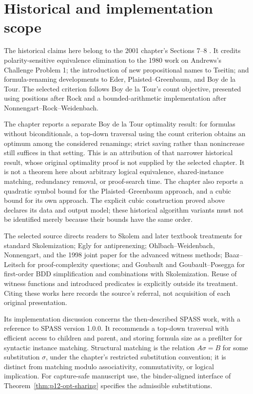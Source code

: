 \section{Historical and implementation scope}
\label{sec:p12-opt-history}
The historical claims here belong to the 2001 chapter's
Sections 7--8 \cite[pp.~363--365]{NonnengartWeidenbach2001SmallClauses}.
It credits polarity-sensitive equivalence elimination to the 1980
work on Andrews's Challenge Problem 1; the introduction of new
propositional names to Tseitin; and formula-renaming developments
to Eder, Plaisted--Greenbaum, and Boy de la Tour.
The selected criterion follows Boy de la Tour's count objective,
presented using positions after Rock and a bounded-arithmetic
implementation after Nonnengart--Rock--Weidenbach.

The chapter reports a separate Boy de la Tour optimality result:
for formulas without biconditionals, a top-down traversal using the
count criterion obtains an optimum among the considered renamings;
strict saving rather than nonincrease still suffices in that setting.
This is an attribution of that narrower historical result, whose
original optimality proof is not supplied by the selected chapter.
It is not a theorem here about arbitrary logical equivalence,
shared-instance matching, redundancy removal, or proof-search time.
The chapter also reports a quadratic symbol bound for the
Plaisted--Greenbaum approach, and a cubic bound for its own
approach. The explicit cubic construction proved above declares
its data and output model; these historical algorithm variants
must not be identified merely because their bounds have the same order.

The selected source directs readers to Skolem and later textbook
treatments for standard Skolemization; Egly for antiprenexing;
Ohlbach--Weidenbach, Nonnengart, and the 1998 joint paper for the
advanced witness methods; Baaz--Leitsch for proof-complexity
questions; and Goubault and Goubault--Posegga for first-order
BDD simplification and combinations with Skolemization.
Reuse of witness functions and introduced predicates is explicitly
outside its treatment. Citing these works here records the
source's referral, not acquisition of each original presentation.

Its implementation discussion concerns the then-described SPASS
work, with a reference to SPASS version 1.0.0. It recommends a
top-down traversal with efficient access to children and parent,
and storing formula size as a prefilter for syntactic instance
matching. Structural matching is the relation
\(A\sigma=B\) for some substitution \(\sigma\),
under the chapter's restricted substitution convention; it is
distinct from matching modulo associativity, commutativity,
or logical implication. For capture-safe manuscript use, the
binder-aligned interface of
Theorem~\ref{thm:p12-opt-sharing} specifies the admissible substitutions.

